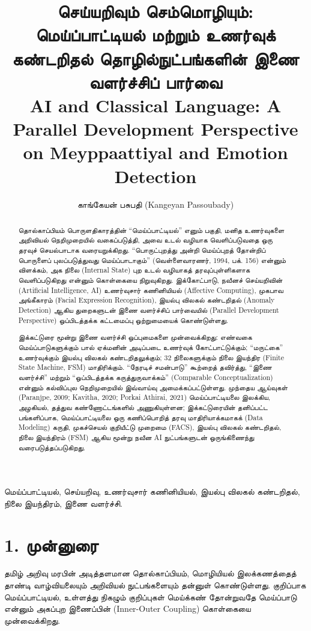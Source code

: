 \documentclass[journal,10pt,twocolumn]{IEEEtran}
\title{செய்யறிவும் செம்மொழியும்: மெய்ப்பாட்டியல் மற்றும் உணர்வுக் கண்டறிதல் தொழில்நுட்பங்களின் இணை வளர்ச்சிப் பார்வை\\\large{AI and Classical Language: A Parallel Development Perspective on Meyppaattiyal and Emotion Detection}}
\author{காங்கேயன் பசுபதி (Kangeyan Passoubady)}
\begin{document}
\maketitle

\begin{abstract}
தொல்காப்பியம் பொருளதிகாரத்தின் “மெய்ப்பாட்டியல்” எனும் பகுதி, மனித உணர்வுகளை அறிவியல் நெறிமுறையில் வகைப்படுத்தி, அவை உடல் வழியாக வெளிப்படுவதை ஒரு தரவுச் செயல்பாடாக வரையறுக்கிறது. “பொருட்புறத்து அன்றி மெய்ப்புறத் தோன்றிப் பொருளைப் புலப்படுத்துவது மெய்ப்பாடாகும்” (வெள்ளைவாரணர், 1994, பக். 156) என்னும் விளக்கம், அக நிலை (Internal State) புற உடல் வழியாகத் தரவுப்புள்ளிகளாக வெளிப்படுகிறது என்னும் கொள்கையை நிறுவுகிறது. இக்கோட்பாடு, நவீனச் செய்யறிவின் (Artificial Intelligence, AI) உணர்வுசார் கணினியியல் (Affective Computing), முகபாவ அங்கீகாரம் (Facial Expression Recognition), இயல்பு விலகல் கண்டறிதல் (Anomaly Detection) ஆகிய துறைகளுடன் இணை வளர்ச்சிப் பார்வையில் (Parallel Development Perspective) ஒப்பிடத்தக்க கட்டமைப்பு ஒற்றுமையைக் கொண்டுள்ளது.

இக்கட்டுரை மூன்று இணை வளர்ச்சி ஒப்புமைகளை முன்வைக்கிறது: எண்வகை மெய்ப்பாடுகளுக்கும் பால் ஏக்மனின் அடிப்படை உணர்வுக் கோட்பாட்டுக்கும்; “மருட்கை” உணர்வுக்கும் இயல்பு விலகல் கண்டறிதலுக்கும்; 32 நிலைகளுக்கும் நிலை இயந்திர (Finite State Machine, FSM) மாதிரிக்கும். “நேரடிச் சமன்பாடு” கூற்றைத் தவிர்த்து, “இணை வளர்ச்சி” மற்றும் “ஒப்பிடத்தக்க கருத்துருவாக்கம்” (Comparable Conceptualization) என்னும் கல்விப்புல நெறிமுறையில் இவ்வாய்வு அமைக்கப்பட்டுள்ளது. முந்தைய ஆய்வுகள் (Paranjpe, 2009; Kavitha, 2020; Porkai Athirai, 2021) மெய்ப்பாட்டியலை இலக்கிய, அழகியல், தத்துவ கண்ணோட்டங்களில் அணுகியுள்ளன; இக்கட்டுரையின் தனிப்பட்ட பங்களிப்பாக, மெய்ப்பாட்டியலை ஒரு கணிப்பொறித் தரவு மாதிரியாக்கமாகக் (Data Modeling) கருதி, முகச்செயல் குறியீட்டு முறைமை (FACS), இயல்பு விலகல் கண்டறிதல், நிலை இயந்திரம் (FSM) ஆகிய மூன்று நவீன AI நுட்பங்களுடன் ஒருங்கிணைந்து வரைபடுத்தப்படுகிறது.
\end{abstract}

\begin{IEEEkeywords}
மெய்ப்பாட்டியல், செய்யறிவு, உணர்வுசார் கணினியியல், இயல்பு விலகல் கண்டறிதல், நிலை இயந்திரம், இணை வளர்ச்சி.
\end{IEEEkeywords}

\section{1. முன்னுரை}\label{uxbaeuxba9uxba9uxbb0}

தமிழ் அறிவு மரபின் அடித்தளமான தொல்காப்பியம், மொழியியல் இலக்கணத்தைத் தாண்டி
வாழ்வியலையும் அறிவியல் நுட்பங்களையும் தன்னுள் கொண்டுள்ளது. குறிப்பாக மெய்ப்பாட்டியல்,
உள்ளத்து நிகழும் குறிப்புகள் மெய்க்கண் தோன்றுவதே மெய்ப்பாடு என்னும் அகப்புற இணைப்பின்
(Inner-Outer Coupling) கொள்கையை முன்வைக்கிறது.
\end{document}
